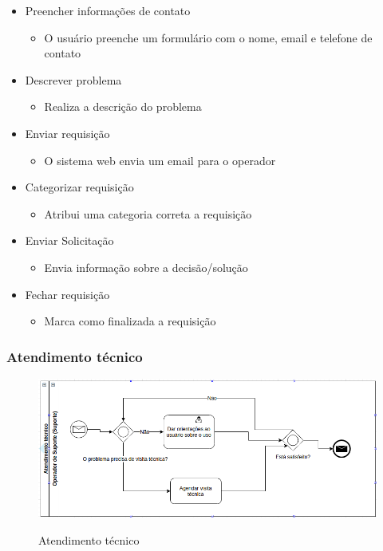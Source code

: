 \begin{itemize}[noitemsep]
	\item Preencher informações de contato
		\begin{itemize}
			\item O usuário preenche um formulário com o nome, email e telefone de contato
		\end{itemize}
	\item Descrever problema
		\begin{itemize}
			\item Realiza a descrição do problema
		\end{itemize}
	\item Enviar requisição
		\begin{itemize}
			\item O sistema web envia um email para o operador
		\end{itemize}
	\item Categorizar requisição
		\begin{itemize}
			\item Atribui uma categoria correta a requisição
		\end{itemize}
	\item Enviar Solicitação
		\begin{itemize}
			\item Envia informação sobre a decisão/solução
		\end{itemize}
	\item Fechar requisição
		\begin{itemize}
			\item Marca como finalizada a requisição
		\end{itemize}
\end{itemize}


\subsubsection{Atendimento técnico}

\begin{figure}[!h]
\caption{Atendimento técnico}
\centering %
\includegraphics[width=15cm]{as-is/02_atendimento_tecnico.png}
\label{figura:suporte_tecnico_as_is}
\end{figure}

